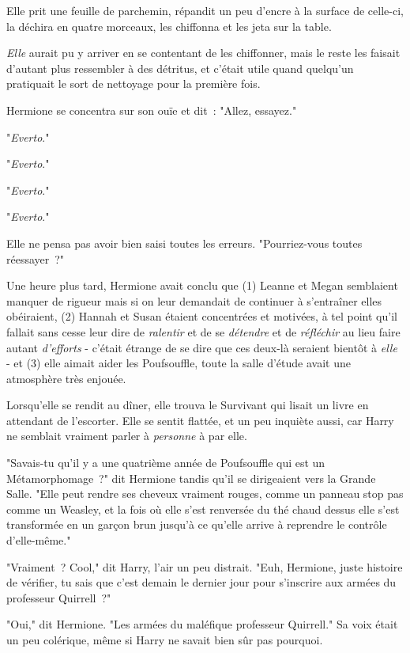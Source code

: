 Elle prit une feuille de parchemin, répandit un peu d'encre à la surface de celle-ci, la déchira en quatre morceaux, les chiffonna et les jeta sur la table.

\emph{Elle} aurait pu y arriver en se contentant de les chiffonner, mais le reste les faisait d'autant plus ressembler à des détritus, et c'était utile quand quelqu'un pratiquait le sort de nettoyage pour la première fois.

Hermione se concentra sur son ouïe et dit~: "Allez, essayez."

"\emph{Everto}."

"\emph{Everto}."

"\emph{Everto}."

"\emph{Everto}."

Elle ne pensa pas avoir bien saisi toutes les erreurs. "Pourriez-vous toutes réessayer~?"

Une heure plus tard, Hermione avait conclu que (1) Leanne et Megan semblaient manquer de rigueur mais si on leur demandait de continuer à s'entraîner elles obéiraient, (2) Hannah et Susan étaient concentrées et motivées, à tel point qu'il fallait sans cesse leur dire de \emph{ralentir} et de se \emph{détendre} et de \emph{réfléchir} au lieu faire autant \emph{d'efforts} - c'était étrange de se dire que ces deux-là seraient bientôt à \emph{elle} - et (3) elle aimait aider les Poufsouffle, toute la salle d'étude avait une atmosphère très enjouée.

Lorsqu'elle se rendit au dîner, elle trouva le Survivant qui lisait un livre en attendant de l'escorter. Elle se sentit flattée, et un peu inquiète aussi, car Harry ne semblait vraiment parler à \emph{personne} à par elle.

"Savais-tu qu'il y a une quatrième année de Poufsouffle qui est un Métamorphomage~?" dit Hermione tandis qu'il se dirigeaient vers la Grande Salle. "Elle peut rendre ses cheveux vraiment rouges, comme un panneau stop pas comme un Weasley, et la fois où elle s'est renversée du thé chaud dessus elle s'est transformée en un garçon brun jusqu'à ce qu'elle arrive à reprendre le contrôle d'elle-même."

"Vraiment~? Cool," dit Harry, l'air un peu distrait. "Euh, Hermione, juste histoire de vérifier, tu sais que c'est demain le dernier jour pour s'inscrire aux armées du professeur Quirrell~?"

"Oui," dit Hermione. "Les armées du maléfique professeur Quirrell." Sa voix était un peu colérique, même si Harry ne savait bien sûr pas pourquoi.

